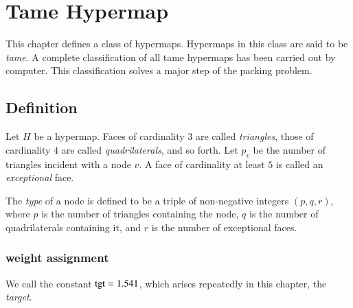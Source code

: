 


\chapter{Tame Hypermap}

\label{sec:tame}


This chapter defines a class of hypermaps.  Hypermaps in this class
are said to be {\it tame}.  A complete
classification of all tame hypermaps has been carried out by computer.   This classification solves a
major step of the packing problem.

\section{Definition}


\begin{definition}
Let $H$ be a hypermap.
Faces of cardinality $3$ are called {\it triangles}, those of
cardinality $4$ are called {\it quadrilaterals}, and so forth. Let
$p_v$ be the number of triangles incident with a node $v$. A face of
cardinality at least $5$ is called an {\it exceptional\/} face.
\end{definition}

\begin{definition}[type,~$(p,q,r)$]\label{definition:type}
The {\it type\/} of a node is defined to be a triple of
non-negative integers $(p,q,r)$, where $p$ is the number of
triangles containing the node, $q$ is the number of quadrilaterals
containing it, and $r$ is the number of exceptional faces.
%
\end{definition}


\subsection{weight assignment}\label{sec:wtassign}

We call the constant ${\operatorname{tgt}}=1.541$, which arises repeatedly in
this chapter, the {\it target}. 
%

